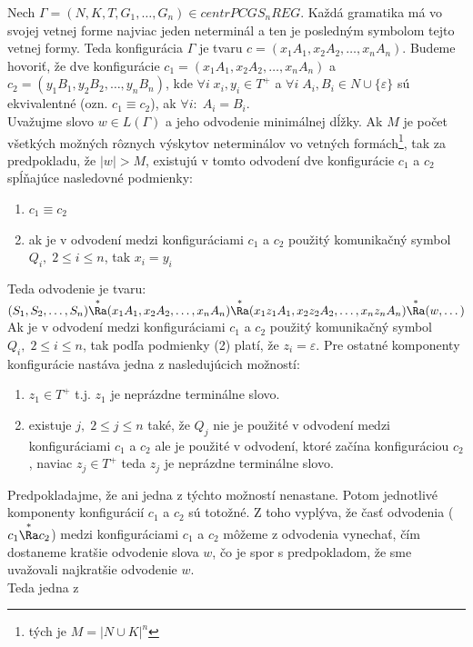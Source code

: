 \begin{dokaz}
Nech $\Gamma=(N,K,T,G_1,\dots ,G_n)\in centrPCGS_nREG$. Každá
gramatika má vo svojej vetnej forme najviac jeden neterminál a ten
je posledným symbolom tejto vetnej formy. Teda konfigurácia
$\Gamma$ je tvaru $c=(x_1A_1,x_2A_2,\dots ,x_nA_n)$. Budeme
hovoriť, že dve konfigurácie $c_1=(x_1A_1,x_2A_2,\dots ,x_nA_n)$ a
$c_2=(y_1B_1,y_2B_2,\dots ,y_nB_n)$, kde $\forall i\; x_i,y_i\in
T^+$ a $\forall i\; A_i,B_i\in N\cup\{\varepsilon\}$ sú
ekvivalentné (ozn. $c_1\equiv c_2$), ak $\forall i :\; A_i=B_i$.
\\ Uvažujme slovo $w\in L(\Gamma)$ a jeho odvodenie minimálnej
dĺžky. Ak $M$ je počet všetkých možných rôznych výskytov
neterminálov vo vetných formách\footnote{tých je $M=|N\cup K|^n$},
tak za predpokladu, že $|w|>M$, existujú v tomto odvodení dve
konfigurácie $c_1$ a $c_2$ spĺňajúce nasledovné podmienky:
\begin{enumerate}
  \item $c_1\equiv c_2$
  \item ak je v odvodení medzi konfiguráciami $c_1$ a $c_2$ použitý
  komunikačný symbol $Q_i,\; 2\leq i\leq n$, tak $x_i=y_i$
\end{enumerate}
Teda odvodenie je tvaru: \\ $(S_1,S_2,\dots ,S_n)\overset{*}\Ra
(x_1A_1,x_2A_2,\dots ,x_nA_n)\overset{*}\Ra
(x_1z_1A_1,x_2z_2A_2,\dots ,x_nz_nA_n)\overset{*}\Ra (w,\dots)$ \\
Ak je v odvodení medzi konfiguráciami $c_1$ a $c_2$ použitý
komunikačný symbol $Q_i,\; 2\leq i\leq n$, tak podľa podmienky (2)
platí, že $z_i=\varepsilon$. Pre ostatné komponenty konfigurácie
nastáva jedna z nasledujúcich možností:
\begin{enumerate}
  \item $z_1\in T^+$ t.j. $z_1$ je neprázdne terminálne slovo.
  \item existuje $j,\; 2\leq j\leq n$ také, že $Q_j$ nie je použité v odvodení medzi
  konfiguráciami $c_1$ a $c_2$ ale je použité v odvodení, ktoré
  začína konfiguráciou $c_2$, naviac $z_j\in T^+$ teda $z_j$ je
  neprázdne terminálne slovo.
\end{enumerate}
Predpokladajme, že ani jedna z týchto možností nenastane. Potom
jednotlivé komponenty konfigurácií $c_1$ a $c_2$ sú totožné. Z
toho vyplýva, že časť odvodenia ($c_1\overset{*}\Ra c_2$) medzi
konfiguráciami $c_1$ a $c_2$ môžeme z odvodenia vynechať, čím
dostaneme kratšie odvodenie slova $w$, čo je spor s predpokladom,
že sme uvažovali najkratšie odvodenie $w$. \\ Teda jedna z

\end{dokaz}
